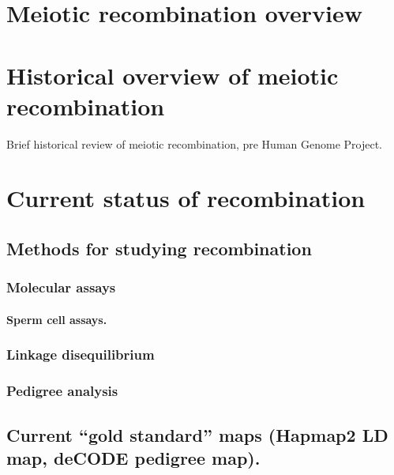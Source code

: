 
\section{Meiotic recombination overview}

\section{Historical overview of meiotic recombination}

Brief historical review of meiotic recombination, pre Human Genome Project.

\section{Current status of recombination}

\subsection{Methods for studying recombination}
\subsubsection{Molecular assays}
\paragraph{Sperm cell assays.}
\subsubsection{Linkage disequilibrium}
\subsubsection{Pedigree analysis}

\subsection{Current ``gold standard'' maps (Hapmap2 LD map, deCODE pedigree map).}

